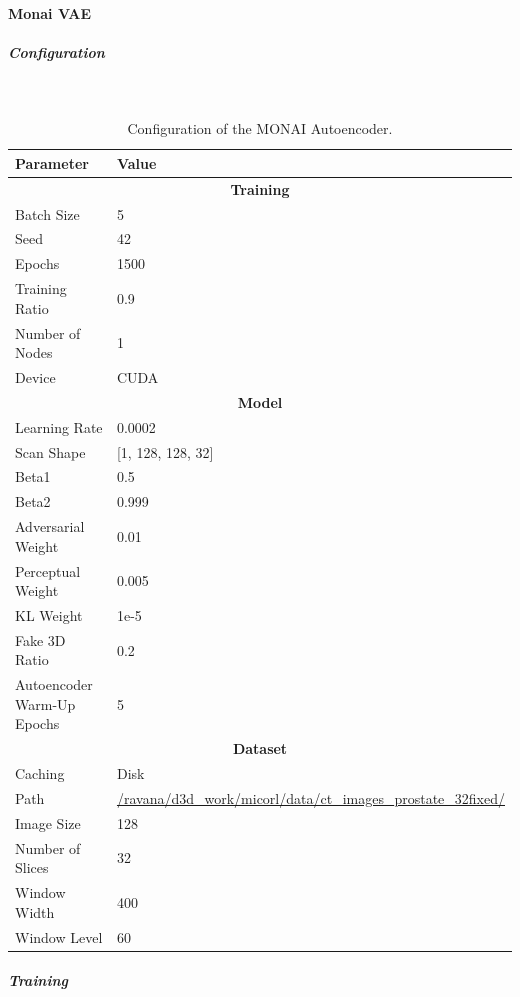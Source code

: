 \paragraph{Monai VAE}\mbox{}
\subparagraph{Configuration}\mbox{}\\
\begin{table}[h!]
\centering
\begin{tabular}{|l|l|}
\hline
\textbf{Parameter} & \textbf{Value} \\
\hline
\multicolumn{2}{|c|}{\textbf{Training}} \\
\hline
Batch Size & 5 \\
\hline
Seed & 42 \\
\hline
Epochs & 1500 \\
\hline
Training Ratio & 0.9 \\
\hline
Number of Nodes & 1 \\
\hline
Device & CUDA \\
\hline
\multicolumn{2}{|c|}{\textbf{Model}} \\
\hline
Learning Rate & 0.0002 \\
\hline
Scan Shape & [1, 128, 128, 32] \\
\hline
Beta1 & 0.5 \\
\hline
Beta2 & 0.999 \\
\hline
Adversarial Weight & 0.01 \\
\hline
Perceptual Weight & 0.005 \\
\hline
KL Weight & 1e-5 \\
\hline
Fake 3D Ratio & 0.2 \\
\hline
Autoencoder Warm-Up Epochs & 5 \\
\hline
\multicolumn{2}{|c|}{\textbf{Dataset}} \\
\hline
Caching & Disk \\
\hline
Path & \url{/ravana/d3d\_work/micorl/data/ct\_images\_prostate\_32fixed/} \\
\hline
Image Size & 128 \\
\hline
Number of Slices & 32 \\
\hline
Window Width & 400 \\
\hline
Window Level & 60 \\
\hline
\end{tabular}
\caption{Configuration of the MONAI Autoencoder.}
\label{table:monai_autoencoder_params}
\end{table}

\newpage
\subparagraph{Training}\mbox{}\\

